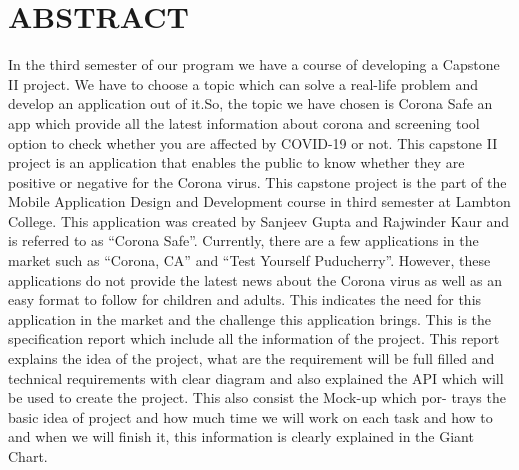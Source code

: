 \section *{\LARGE ABSTRACT}
In the third semester of our program we have a course of developing a Capstone II project. We have to choose a topic which can solve a real-life problem and develop an application out of it.So, the topic we have chosen is Corona Safe an app which provide all the latest information about corona and screening tool option to check whether you are affected by COVID-19 or not.
This capstone II project is an application that enables the public to know whether they are positive or negative for the Corona virus. This capstone project is the part of the Mobile Application Design and Development course in third semester at Lambton College. This application was created by Sanjeev Gupta and Rajwinder Kaur and is referred to as “Corona Safe”. Currently, there are a few applications in the market such as “Corona, CA” and “Test Yourself Puducherry”. However, these applications do not provide the latest news about the Corona virus as well as an easy format to follow for children and adults. This indicates the need for this application in the market and the challenge this application brings. 
This is the specification report which include all the information of the project. This report explains the idea of the project, what are the requirement will be full filled and technical requirements with clear diagram and also explained the API which will be used to create the project. This also consist the Mock-up which por- trays the basic idea of project and how much time we will work on each task and how to and when we will finish it, this information is clearly explained in the Giant Chart.
